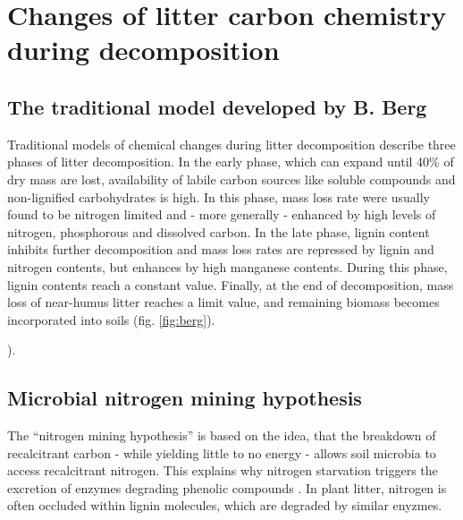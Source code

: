 \section{Changes of litter carbon chemistry during decomposition}

\subsection{The traditional model developed by B. Berg}

Traditional models of chemical changes during litter decomposition describe three phases of litter decomposition. In the early phase, which can expand until 40\% of dry mass are lost, availability of labile carbon sources like soluble compounds and non-lignified carbohydrates is high. In this phase, mass loss rate were usually found to be nitrogen limited and - more generally - enhanced by high levels of nitrogen, phosphorous and dissolved carbon. In the late phase, lignin content inhibits further decomposition and mass loss rates are repressed by lignin and nitrogen contents, but enhances by high manganese contents. During this phase, lignin contents reach a constant value. Finally, at the end of decomposition, mass loss of near-humus litter reaches a limit value, and remaining biomass becomes incorporated into soils (fig. \ref{fig:berg}). 

\cite{Berg2008}).

\subsection{Microbial nitrogen mining hypothesis}

The “nitrogen mining hypothesis” is based on the idea, that the breakdown of recalcitrant carbon - while yielding little to no energy - allows soil microbia to access recalcitrant nitrogen. This explains why nitrogen starvation triggers the excretion of enzymes degrading phenolic compounds \citep{Craine2007}. In plant litter, nitrogen is often occluded within lignin molecules, which are degraded by similar enyzmes. 


